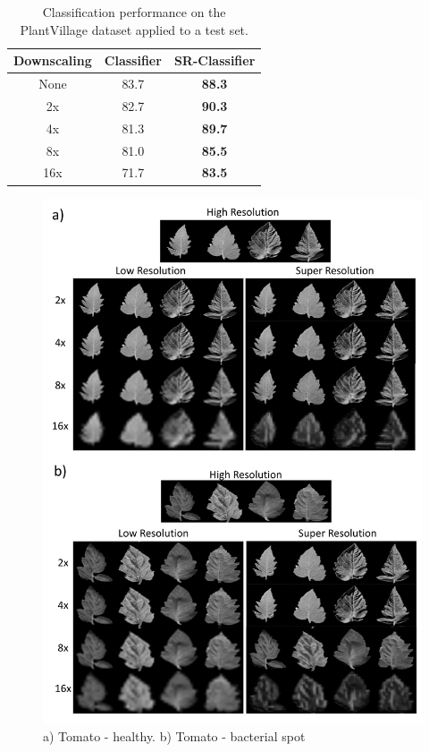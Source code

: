 \documentclass[10pt,twocolumn,letterpaper]{article}
\begin{document}
\begin{table}[h]
\caption{Classification performance on the PlantVillage dataset applied to a test set.}
\label{tab:results}
\centering
\begin{tabular}{|c|c|c|}
\hline
  Downscaling & Classifier & SR-Classifier \\
\hline
\hline
None & 83.7 & \textbf{88.3} \\
2x & 82.7 & \textbf{90.3} \\
4x & 81.3 & \textbf{89.7} \\
8x & 81.0 & \textbf{85.5} \\
16x & 71.7 & \textbf{83.5} \\
\hline
\end{tabular}
\end{table}

\begin{figure}[h]
\begin{center}
\includegraphics[scale=0.40]{results/srimages.pdf}
\end{center}
   \caption{a) Tomato - healthy. b) Tomato - bacterial spot} 
\label{fig:srimages}
\end{figure}
\end{document}
